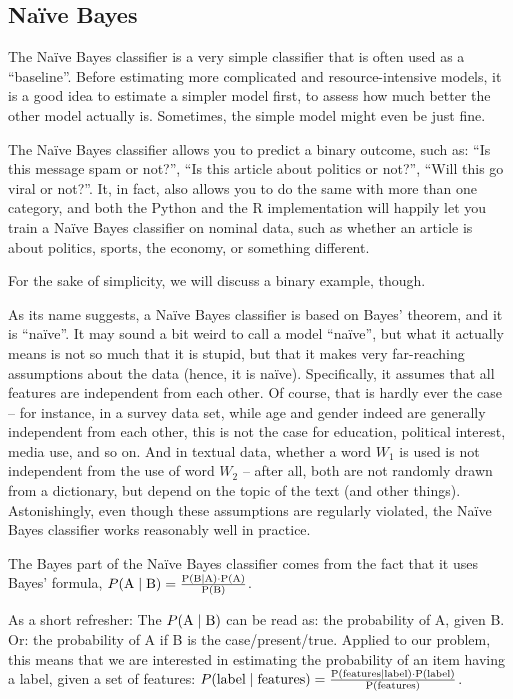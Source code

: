 \subsection{Na\"ive Bayes}
\label{subsec:Na\"ive Bayes}

The Na\"ive Bayes classifier is a very simple classifier that is often
used as a ``baseline''. Before estimating more complicated and
resource-intensive models, it is a good idea to estimate a simpler
model first, to assess how much better the other model actually
is. Sometimes, the simple model might even be just fine.

The Na\"ive Bayes classifier allows you to predict a binary outcome,
such as: ``Is this message spam or not?'', ``Is this article about
politics or not?'', ``Will this go viral or not?''.  It, in fact, also
allows you to do the same with more than one category, and both the
Python and the R implementation will happily let you train a Na\"ive
Bayes classifier on nominal data, such as whether an article is about
politics, sports, the economy, or something different.

For the sake of simplicity, we will discuss a binary example, though.

As its name suggests, a Na\"ive Bayes classifier is based on Bayes'
theorem, and it is ``na\"ive''.  It may sound a bit weird to call a
model ``na\"ive'', but what it actually means is not so much that it
is stupid, but that it makes very far-reaching assumptions about the
data (hence, it is na\"ive). Specifically, it assumes that all
features are independent from each other.  Of course, that is hardly
ever the case -- for instance, in a survey data set, while age and
gender indeed are generally independent from each other, this is not the case for education, political interest,
media use, and so on.  And in textual data, whether a word $W_1$ is used
is not independent from the use of word $W_2$ -- after all, both are not
randomly drawn from a dictionary, but depend on the topic of the text
(and other things).  Astonishingly, even though these assumptions are
regularly violated, the Na\"ive Bayes classifier works reasonably well
in practice.

The Bayes part of the Na\"ive Bayes classifier comes from the fact
that it uses Bayes' formula, $ P(\rm{A} \mid \rm{B}) = \frac{P(\rm{B} \mid \rm{A}) \cdot P(\rm{A})}{P(\rm {B})} $.

As a short refresher: The $P(\rm{A} \mid \rm{B})$ can be read as: the
probability of A, given B. Or: the probability of A if B is the
case/present/true.  Applied to our problem, this means that we are
interested in estimating the probability of an item having a label,
given a set of features:
$ P(\rm{label} \mid \rm{features}) = \frac{P(\rm{features} \mid \rm{label}) \cdot P(\rm{label})}{P(\rm{features})} $.


